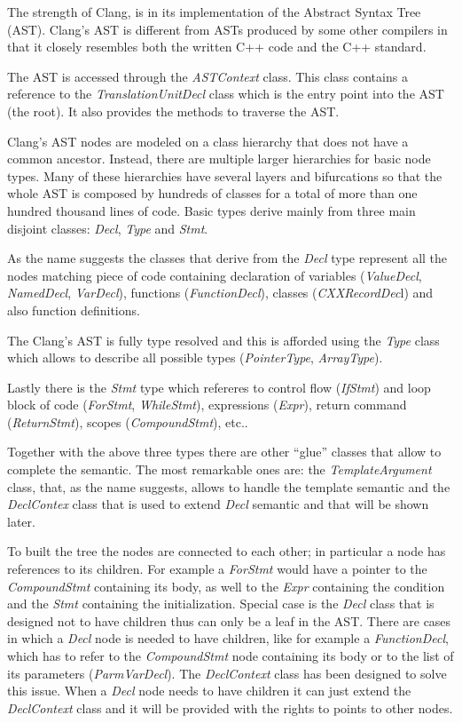 \documentclass[a4paper,11pt,oneside]{book}
\begin{document}
The strength of Clang, is in its implementation of the Abstract Syntax Tree (AST). Clang’s AST is different from ASTs produced by some other compilers in that it closely resembles both the written C++ code and the C++ standard.

The AST is accessed through the \emph{ASTContext} class. This class contains a reference to the \emph{TranslationUnitDecl} class which is the entry point into the AST (the root). It also provides the methods to traverse the AST.

Clang’s AST nodes are modeled on a class hierarchy that does not have a common ancestor. Instead, there are multiple larger hierarchies for basic node types. Many of these hierarchies have several layers and bifurcations so that the whole AST is composed by hundreds of classes for a total of more than one hundred thousand lines of code. Basic types derive mainly from three main disjoint classes: \emph{Decl}, \emph{Type} and \emph{Stmt}. 

As the name suggests the classes that derive from the \emph{Decl} type represent all the nodes matching piece of code containing declaration of variables (\emph{ValueDecl}, \emph{NamedDecl}, \emph{VarDecl}), functions (\emph{FunctionDecl}), classes (\emph{CXXRecordDec}l) and also function definitions.
  
The Clang’s AST is fully type resolved and this is afforded using the \emph{Type} class which allows to describe all possible types (\emph{PointerType}, \emph{ArrayType}).

Lastly there is the \emph{Stmt} type which refereres to control flow (\emph{IfStmt}) and loop block of code (\emph{ForStmt}, \emph{WhileStmt}), expressions (\emph{Expr}), return command (\emph{ReturnStmt}), scopes (\emph{CompoundStmt}), etc.. 

Together with the above three types there are other “glue” classes that allow to complete the semantic. The most remarkable ones are: the \emph{TemplateArgument} class, that, as the name suggests, allows to handle the template semantic and the \emph{DeclContex} class that is used to extend \emph{Decl} semantic and that will be shown later. 

To built the tree the nodes are connected to each other; in particular a node has references to its children. For example a \emph{ForStmt} would have a pointer to the \emph{CompoundStmt} containing its body, as well to the \emph{Expr} containing the condition and the \emph{Stmt} containing the initialization. Special case is the \emph{Decl} class that is designed not to have children thus can only be a leaf in the AST. There are cases in which a \emph{Decl} node is needed to have children, like for example a \emph{FunctionDecl}, which has to refer to the \emph{CompoundStmt} node containing its body or to the list of its parameters (\emph{ParmVarDecl}). The \emph{DeclContext} class has been designed to solve this issue. When a \emph{Decl} node needs to have children it can just extend the \emph{DeclContext} class and it will be provided with the rights to points to other nodes. 
\end{document}
